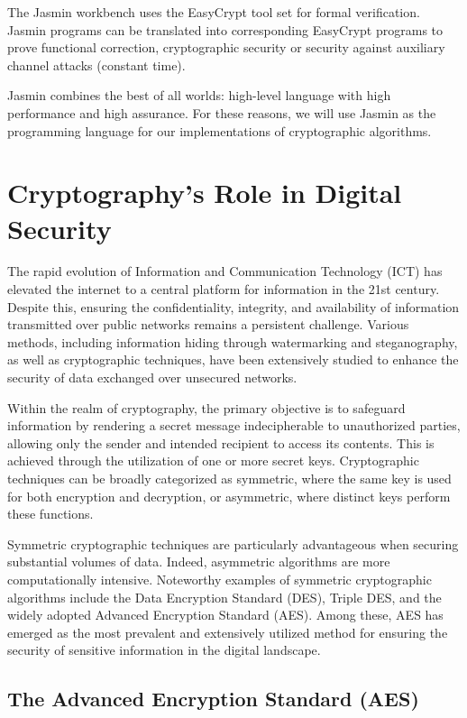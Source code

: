 \documentclass[runningheads]{llncs}
\begin{document}
The Jasmin workbench uses the EasyCrypt tool set for formal verification. Jasmin programs can be translated into corresponding EasyCrypt programs to prove functional correction, cryptographic security or security against auxiliary channel attacks (constant time).

Jasmin combines the best of all worlds: high-level language with high performance and high assurance. For these reasons, we will use Jasmin as the programming language for our implementations of cryptographic algorithms.



\section{Cryptography's Role in Digital Security}

The rapid evolution of Information and Communication Technology (ICT) has elevated the internet to a central platform for information in the 21st century. Despite this, ensuring the confidentiality, integrity, and availability of information transmitted over public networks remains a persistent challenge. Various methods, including information hiding through watermarking and steganography, as well as cryptographic techniques, have been extensively studied to enhance the security of data exchanged over unsecured networks.

Within the realm of cryptography, the primary objective is to safeguard information by rendering a secret message indecipherable to unauthorized parties, allowing only the sender and intended recipient to access its contents. This is achieved through the utilization of one or more secret keys. Cryptographic techniques can be broadly categorized as symmetric, where the same key is used for both encryption and decryption, or asymmetric, where distinct keys perform these functions.

Symmetric cryptographic techniques are particularly advantageous when securing substantial volumes of data. Indeed, asymmetric algorithms are more computationally intensive. Noteworthy examples of symmetric cryptographic algorithms include the Data Encryption Standard (DES), Triple DES, and the widely adopted Advanced Encryption Standard (AES). Among these, AES has emerged as the most prevalent and extensively utilized method for ensuring the security of sensitive information in the digital landscape.

\subsection{The Advanced Encryption Standard (AES)}
\end{document}
